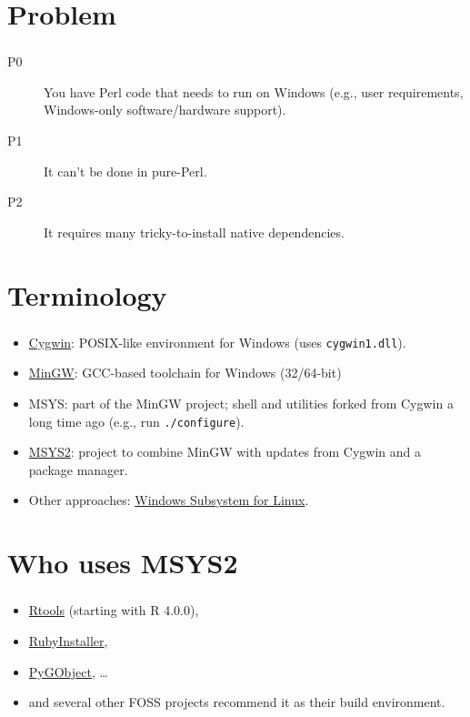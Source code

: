 \documentclass{beamer}
\begin{document}

\frame{\titlepage}

\section{Problem}
\begin{frame}\frametitle{\secname}
	\begin{description}
		\item[P0] You have Perl code that needs to run on
			Windows (e.g., user requirements,
			Windows-only software/hardware support).
		\pause
		\item[P1] It can't be done in pure-Perl.
		\pause
		\item[P2] It requires many tricky-to-install
			native dependencies.
	\end{description}
\end{frame}

\section{Terminology}
\begin{frame}\frametitle{\secname}
\begin{itemize}[<+->]
	\item \href{https://www.cygwin.com/}{Cygwin}: POSIX-like environment for Windows (uses
		\texttt{cygwin1.dll}).
	\item \href{http://mingw.org/}{MinGW}: GCC-based toolchain for Windows (32/64-bit)
	\item MSYS: part of the MinGW project; shell and utilities forked from Cygwin a long
		time ago (e.g., run \texttt{./configure}).
	\item \href{https://www.msys2.org/}{MSYS2}: project to combine MinGW with updates from
		Cygwin and a package manager.
	\item Other approaches: \href{https://docs.microsoft.com/windows/wsl}{Windows Subsystem for Linux}.
\end{itemize}
\end{frame}

\section{Who uses MSYS2}
\begin{frame}\frametitle{\secname}
\begin{itemize}
	\item \href{https://cran.r-project.org/bin/windows/Rtools/}{Rtools}
		(starting with R 4.0.0),
	\item \href{https://github.com/oneclick/rubyinstaller2}{RubyInstaller},
	\item \href{https://pygobject.readthedocs.io/en/latest/getting_started.html#windows-getting-started}{PyGObject},
	\ldots
	\item and several other FOSS projects recommend it
		as their build environment.
\end{itemize}
\end{frame}
\end{document}
